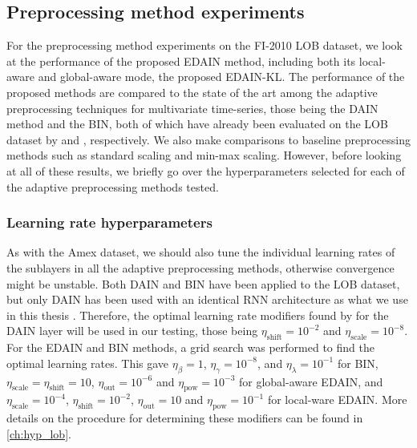 \documentclass{statsmsc}
\begin{document}
{%

\subsection{Preprocessing method experiments}%
\label{sub:Preprocessing method experiments}

For the preprocessing method experiments on the FI-2010 \ac{LOB} dataset, we look at the
performance of the proposed \ac{EDAIN} method, including both its local-aware and global-aware
mode, the proposed \ac{EDAIN-KL}. The performance of the proposed methods
are compared to the state of the art among
the adaptive preprocessing techniques for multivariate time-series, those being the
\ac{DAIN} method and the \ac{BIN}, both of which have already been evaluated on the \ac{LOB}
dataset by \cite{dain} and \cite{bin}, respectively. We also make comparisons to baseline
preprocessing methods such as standard scaling and min-max scaling. However, before looking
at all of these results, we briefly go over the hyperparameters selected for each of the
adaptive preprocessing methods tested.

\subsubsection{Learning rate hyperparameters}%
\label{ssub:Learning rate tuning}

As with the Amex dataset, we should also tune the individual learning rates of the sublayers in
all the adaptive preprocessing methods, otherwise convergence might be unstable.
Both \ac{DAIN} and \ac{BIN} have been applied to the \ac{LOB} dataset, but only \ac{DAIN} has been
used with an identical \ac{RNN} architecture as what we use in this thesis \citep{dain}. Therefore, the
optimal learning rate modifiers found by \cite{dain} for the \ac{DAIN} layer will be used
in our testing, those being $\eta_{\textrm{shift}}=10^{-2}$ and $\eta_{\textrm{scale}}=10^{-8}$.
For the \ac{EDAIN} and  \ac{BIN} methods, a grid search was performed to find the optimal learning
rates. This gave $\eta_\beta=1$, $\eta_\gamma=10^{-8}$, and $\eta_\lambda=10^{-1}$ for \ac{BIN},
$\eta_{\textrm{scale}}=\eta_{\textrm{shift}}=10$, $\eta_{\textrm{out}}=10^{-6}$ and $\eta_{\textrm{pow}}=10^{-3}$ for
global-aware \ac{EDAIN}, and
$\eta_{\textrm{scale}}=10^{-4}$, $\eta_{\textrm{shift}}=10^{-2}$, $\eta_{\textrm{out}}=10$ and $\eta_{\textrm{pow}}=10^{-1}$ for
local-ware \ac{EDAIN}.
More details on the procedure for determining these modifiers can be found in \cref{ch:hyp_lob}.

}
\end{document}
